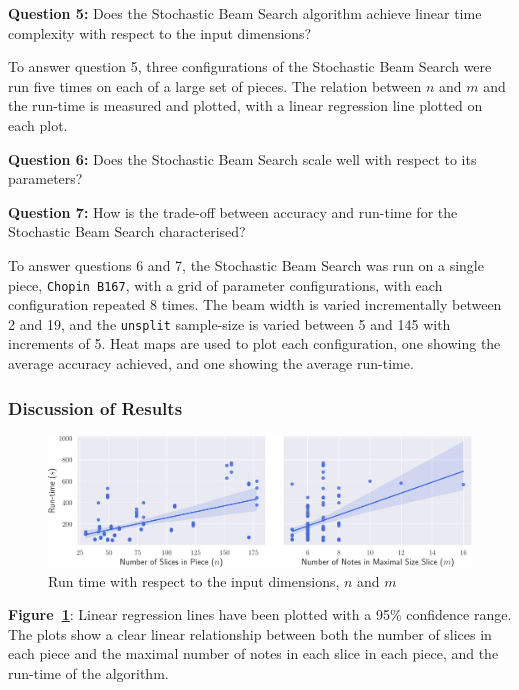 \documentclass[12pt,a4paper,twoside,openany]{report} \usepackage[pdfborder={0 0 0}]{hyperref}    %
\theoremstyle{definition} \newtheorem{definition}{Definition}[section]
\begin{document}
  \textbf{Question 5:} Does the Stochastic Beam Search algorithm achieve linear time complexity with respect to the input dimensions?

  To answer question 5, three configurations of the Stochastic Beam Search were run five times on each of a large set of
  pieces. The relation between $n$ and $m$ and the run-time is measured and plotted, with a linear regression line
  plotted on each plot. 

  \textbf{Question 6:} Does the Stochastic Beam Search scale well with respect to its parameters?

  \textbf{Question 7:} How is the trade-off between accuracy and run-time for the Stochastic Beam
  Search characterised?

  To answer questions 6 and 7, the Stochastic Beam Search was run on a single piece, \texttt{Chopin B167}, with a grid of
  parameter configurations, with each configuration repeated 8 times. The beam width is varied incrementally between 2 and 19, and the
  \texttt{unsplit} sample-size is varied between 5 and 145 with increments of 5.
  Heat maps are used to plot each configuration, one showing the average accuracy achieved, and one showing the average run-time. 
  \subsubsection{Discussion of Results}

  \begin{figure}[ht]
    \begin{center}
      \includegraphics[width=\textwidth]{figs/eval/Extension/scaling.pdf}
    \end{center}
    \caption{Run time with respect to the input dimensions, $n$ and $m$}
    \label{fig:extScaling}
  \end{figure}
\textbf{Figure~\ref{fig:extScaling}}: Linear regression lines have been plotted with a 95\% confidence range. The plots
show a clear linear relationship between both the number of slices in each piece and the maximal number of notes in each
slice in each piece, and the run-time of the algorithm.
\end{document}
